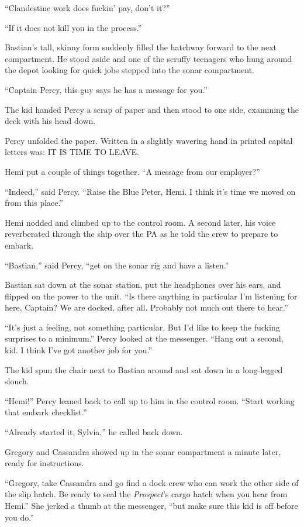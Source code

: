 \documentclass[
]{scrbook}
\begin{document}
``Clandestine work does fuckin' pay, don't it?''

``If it does not kill you in the process.''

Bastian's tall, skinny form suddenly filled the hatchway forward to the
next compartment. He stood aside and one of the scruffy teenagers who
hung around the depot looking for quick jobs stepped into the sonar
compartment.

``Captain Percy, this guy says he has a message for you.''

The kid handed Percy a scrap of paper and then stood to one side,
examining the deck with his head down.

Percy unfolded the paper. Written in a slightly wavering hand in printed
capital letters was: IT IS TIME TO LEAVE.

Hemi put a couple of things together. ``A message from our employer?''

``Indeed,'' said Percy. ``Raise the Blue Peter, Hemi. I think it's time
we moved on from this place.''

Hemi nodded and climbed up to the control room. A second later, his
voice reverberated through the ship over the PA as he told the crew to
prepare to embark.

``Bastian,'' said Percy, ``get on the sonar rig and have a listen.''

Bastian sat down at the sonar station, put the headphones over his ears,
and flipped on the power to the unit. ``Is there anything in particular
I'm listening for here, Captain? We are docked, after all. Probably not
much out there to hear.''

``It's just a feeling, not something particular. But I'd like to keep
the fucking surprises to a minimum.'' Percy looked at the messenger.
``Hang out a second, kid. I think I've got another job for you.''

The kid spun the chair next to Bastian around and sat down in a
long-legged slouch.

``Hemi!'' Percy leaned back to call up to him in the control room.
``Start working that embark checklist.''

``Already started it, Sylvia,'' he called back down.

Gregory and Cassandra showed up in the sonar compartment a minute later,
ready for instructions.

``Gregory, take Cassandra and go find a dock crew who can work the other
side of the slip hatch. Be ready to seal the \emph{Prospect}'s cargo
hatch when you hear from Hemi.'' She jerked a thumb at the messenger,
``but make sure this kid is off before you do.''
\end{document}
